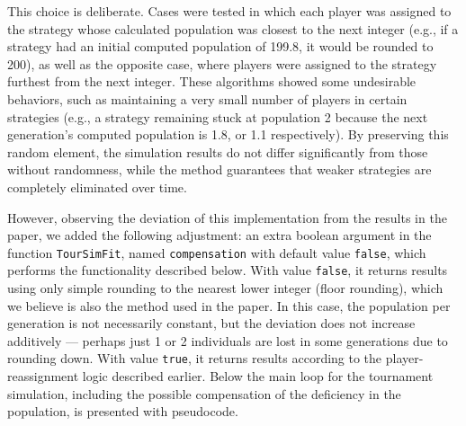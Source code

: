 \documentclass[12pt]{article}
\begin{document}
This choice is deliberate. Cases were tested in which each player was assigned to the strategy whose calculated population was closest to the next integer (e.g., if a strategy had an initial computed population of 199.8, it would be rounded to 200), as well as the opposite case, where players were assigned to the strategy furthest from the next integer. These algorithms showed some undesirable behaviors, such as maintaining a very small number of players in certain strategies (e.g., a strategy remaining stuck at population 2 because the next generation’s computed population is 1.8, or 1.1 respectively). By preserving this random element, the simulation results do not differ significantly from those without randomness, while the method guarantees that weaker strategies are completely eliminated over time.

However, observing the deviation of this implementation from the results in the paper, we added the following adjustment: an extra boolean argument in the function \texttt{TourSimFit}, named \texttt{compensation} with default value \texttt{false}, which performs the functionality described below. With value \texttt{false}, it returns results using only simple rounding to the nearest lower integer (floor rounding), which we believe is also the method used in the paper. In this case, the population per generation is not necessarily constant, but the deviation does not increase additively — perhaps just 1 or 2 individuals are lost in some generations due to rounding down. With value \texttt{true}, it returns results according to the player-reassignment logic described earlier. Below the main loop for the tournament simulation, including the possible compensation of the deficiency in the population, is presented with pseudocode.
\end{document}
